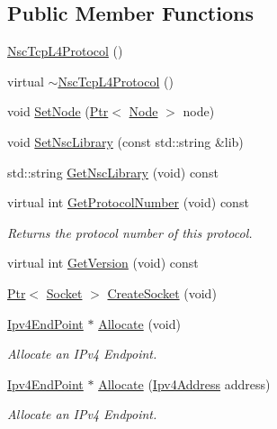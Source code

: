 \subsection*{Public Member Functions}
\begin{DoxyCompactItemize}
\item 
\hyperlink{classns3_1_1NscTcpL4Protocol_a593c89c183c8ba35321da4a6c032ff88}{Nsc\+Tcp\+L4\+Protocol} ()
\item 
virtual \hyperlink{classns3_1_1NscTcpL4Protocol_a589bfdd3a6bc529cbc5baffb621556dc}{$\sim$\+Nsc\+Tcp\+L4\+Protocol} ()
\item 
void \hyperlink{classns3_1_1NscTcpL4Protocol_a4ed1c16d77da3bc0154c71f623a0f445}{Set\+Node} (\hyperlink{classns3_1_1Ptr}{Ptr}$<$ \hyperlink{classns3_1_1Node}{Node} $>$ node)
\item 
void \hyperlink{classns3_1_1NscTcpL4Protocol_aac7e0222ece7f7b1a7400ccf56b42e55}{Set\+Nsc\+Library} (const std\+::string \&lib)
\item 
std\+::string \hyperlink{classns3_1_1NscTcpL4Protocol_af1ca457f1f459cdeefff3015abb6ff29}{Get\+Nsc\+Library} (void) const 
\item 
virtual int \hyperlink{classns3_1_1NscTcpL4Protocol_a58d930c8ddf3fbc26d76103e097fc001}{Get\+Protocol\+Number} (void) const 
\begin{DoxyCompactList}\small\item\em Returns the protocol number of this protocol. \end{DoxyCompactList}\item 
virtual int \hyperlink{classns3_1_1NscTcpL4Protocol_a406e7ae2d2d4fab18d7338fb88060b2d}{Get\+Version} (void) const 
\item 
\hyperlink{classns3_1_1Ptr}{Ptr}$<$ \hyperlink{classns3_1_1Socket}{Socket} $>$ \hyperlink{classns3_1_1NscTcpL4Protocol_a4c34d3dca3ef02f8565a9f979de8fe83}{Create\+Socket} (void)
\item 
\hyperlink{classns3_1_1Ipv4EndPoint}{Ipv4\+End\+Point} $\ast$ \hyperlink{classns3_1_1NscTcpL4Protocol_a86602a6c4ad2bf0c6fe70ca5e709cc6a}{Allocate} (void)
\begin{DoxyCompactList}\small\item\em Allocate an I\+Pv4 Endpoint. \end{DoxyCompactList}\item 
\hyperlink{classns3_1_1Ipv4EndPoint}{Ipv4\+End\+Point} $\ast$ \hyperlink{classns3_1_1NscTcpL4Protocol_aace70bc2df1fedd8d1cf41d012a59b48}{Allocate} (\hyperlink{classns3_1_1Ipv4Address}{Ipv4\+Address} address)
\begin{DoxyCompactList}\small\item\em Allocate an I\+Pv4 Endpoint. \end{DoxyCompactList}\item 

\end{DoxyCompactItemize}
